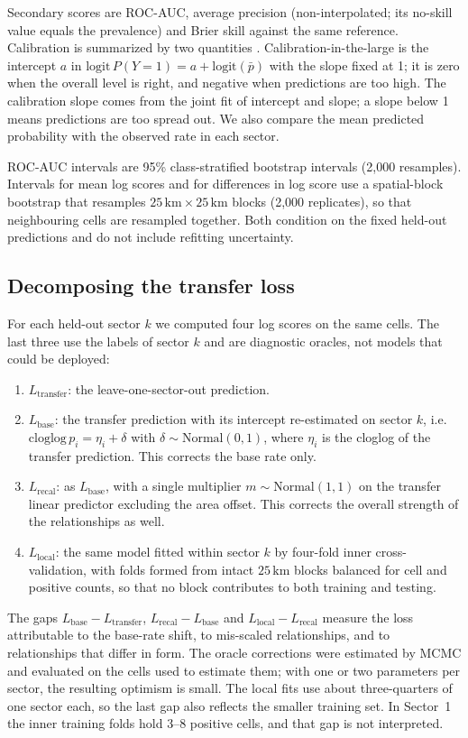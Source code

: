 \documentclass[pdflatex,sn-basic]{sn-jnl}%
\begin{document}
Secondary scores are ROC-AUC, average precision (non-interpolated; its no-skill value equals the prevalence) and Brier skill against the same reference. Calibration is summarized by two quantities \citep{Cox1958, VanCalster2019}. Calibration-in-the-large is the intercept $a$ in $\mathrm{logit}\,P(Y=1)=a+\mathrm{logit}(\bar p)$ with the slope fixed at 1; it is zero when the overall level is right, and negative when predictions are too high. The calibration slope comes from the joint fit of intercept and slope; a slope below 1 means predictions are too spread out. We also compare the mean predicted probability with the observed rate in each sector.

ROC-AUC intervals are 95\% class-stratified bootstrap intervals (2,000 resamples). Intervals for mean log scores and for differences in log score use a spatial-block bootstrap that resamples $25\,\mathrm{km}\times25\,\mathrm{km}$ blocks (2,000 replicates), so that neighbouring cells are resampled together. Both condition on the fixed held-out predictions and do not include refitting uncertainty.

\subsection{Decomposing the transfer loss}
\label{sec:decomposition}

For each held-out sector $k$ we computed four log scores on the same cells. The last three use the labels of sector $k$ and are diagnostic oracles, not models that could be deployed:
\begin{enumerate}
\item $L_{\mathrm{transfer}}$: the leave-one-sector-out prediction.
\item $L_{\mathrm{base}}$: the transfer prediction with its intercept re-estimated on sector $k$, i.e.\ $\mathrm{cloglog}\,p_i=\eta_i+\delta$ with $\delta\sim\mathrm{Normal}(0,1)$, where $\eta_i$ is the cloglog of the transfer prediction. This corrects the base rate only.
\item $L_{\mathrm{recal}}$: as $L_{\mathrm{base}}$, with a single multiplier $m\sim\mathrm{Normal}(1,1)$ on the transfer linear predictor excluding the area offset. This corrects the overall strength of the relationships as well.
\item $L_{\mathrm{local}}$: the same model fitted within sector $k$ by four-fold inner cross-validation, with folds formed from intact $25\,\mathrm{km}$ blocks balanced for cell and positive counts, so that no block contributes to both training and testing.
\end{enumerate}
The gaps $L_{\mathrm{base}}-L_{\mathrm{transfer}}$, $L_{\mathrm{recal}}-L_{\mathrm{base}}$ and $L_{\mathrm{local}}-L_{\mathrm{recal}}$ measure the loss attributable to the base-rate shift, to mis-scaled relationships, and to relationships that differ in form. The oracle corrections were estimated by MCMC and evaluated on the cells used to estimate them; with one or two parameters per sector, the resulting optimism is small. The local fits use about three-quarters of one sector each, so the last gap also reflects the smaller training set. In Sector~1 the inner training folds hold 3--8 positive cells, and that gap is not interpreted.
\end{document}
